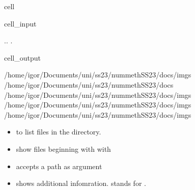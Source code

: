 \documentclass[a4paper,10pt,english]{jupyterBook}
\begin{document}
\begin{sphinxuseclass}{cell}\begin{sphinxVerbatimInput}

\begin{sphinxuseclass}{cell_input}
\begin{sphinxVerbatim}[commandchars=\\\{\}]
..
\PYGZhy{}
.
\end{sphinxVerbatim}

\end{sphinxuseclass}\end{sphinxVerbatimInput}
\begin{sphinxVerbatimOutput}

\begin{sphinxuseclass}{cell_output}
\begin{sphinxVerbatim}[commandchars=\\\{\}]
/home/igor/Documents/uni/ss23/nummethSS23/docs/imgs
/home/igor/Documents/uni/ss23/nummethSS23/docs
/home/igor/Documents/uni/ss23/nummethSS23/docs/imgs
/home/igor/Documents/uni/ss23/nummethSS23/docs/imgs
/home/igor/Documents/uni/ss23/nummethSS23/docs/imgs
\end{sphinxVerbatim}

\end{sphinxuseclass}\end{sphinxVerbatimOutput}

\end{sphinxuseclass}\begin{itemize}
\item {} 
\sphinxAtStartPar
{} to list files in the directory.

\item {} 
\sphinxAtStartPar
show files beginning with  with 

\item {} 
\sphinxAtStartPar
{} accepts a path as argument

\item {} 
\sphinxAtStartPar
{} shows additional infomration.  stands for .

\end{itemize}
\end{document}
